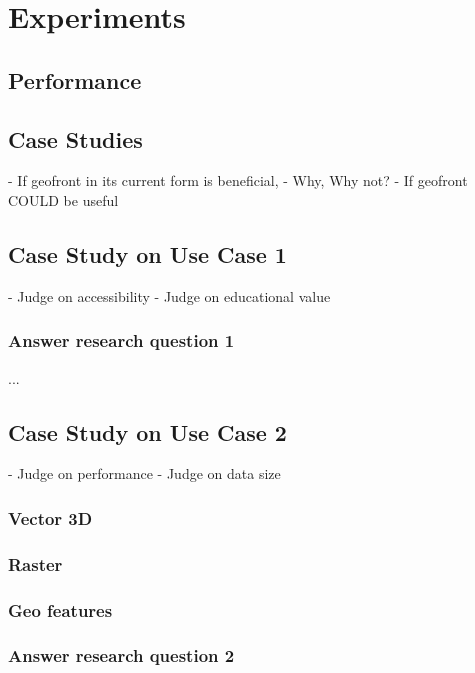 \chapter{Experiments}%

\section{ Performance }

\section{ Case Studies } 
- If geofront in its current form is beneficial,
  - Why, Why not?
- If geofront COULD be useful

\section{Case Study on Use Case 1}%
- Judge on accessibility
- Judge on educational value

\subsection*{Answer research question 1}

...

\section{Case Study on Use Case 2}%
- Judge on performance
- Judge on data size


\subsection{Vector 3D}

\subsection{Raster}

\subsection{Geo features}

\subsection*{Answer research question 2}

